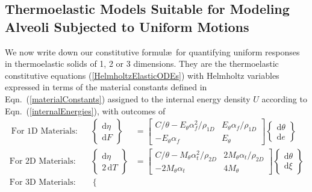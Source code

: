 \subsection{Thermoelastic Models Suitable for Modeling Alveoli Subjected to Uniform Motions}

We now write down our constitutive formul\ae\ for quantifying uniform responses in thermo\-elastic solids of 1, 2 or 3 dimensions.  They are the thermo\-elastic constitutive equations (\ref{HelmholtzElasticODEs}) with Helmholtz variables expressed in terms of the material constants defined in Eqn.~(\ref{materialConstants}) assigned to the internal energy density $U$ according to Eqn.~(\ref{internalEnergies}), with outcomes of
\begin{subequations}
    \label{HelmholtzCEs}
    \begin{align}\
    \text{For 1D Materials:} & &
    \left\{ \begin{matrix}
    \mathrm{d} \eta \\ \mathrm{d} F
    \end{matrix} \right\} & = \begin{bmatrix}
    C / \theta - E_{\theta} \alpha_f^2 / \rho_{1D}& 
    E_{\theta} \alpha_f / \rho_{1D} \\
    -E_{\theta} \alpha_f & E_{\theta}
    \end{bmatrix} \left\{ \begin{matrix}
    \mathrm{d} \theta \\ \mathrm{d} e
    \end{matrix} \right\} \label{Helmholtz1D} \\
    \text{For 2D Materials:} & &
    \left\{ \begin{matrix}
    \mathrm{d} \eta \\ 2 \, \mathrm{d} T
    \end{matrix} \right\} & = \begin{bmatrix}
    C / \theta - M_{\theta} \alpha_t^2 / \rho_{2D} & 
    2 M_{\theta} \alpha_t / \rho_{2D} \\
    -2 M_{\theta} \alpha_t & 4 M_{\theta}
    \end{bmatrix} \left\{ \begin{matrix}
    \mathrm{d} \theta \\ \mathrm{d} \xi
    \end{matrix} \right\} \label{Helmholtz2D} \\
    \text{For 3D Materials:} & &
    \left\{ \begin{matrix}

\end{matrix}
\end{align}
\end{subequations}
